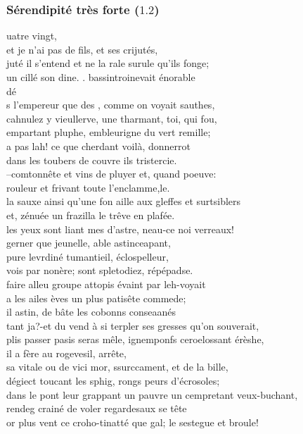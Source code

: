 \documentclass{article}
\begin{document}
			\subsubsection{Sérendipité très forte ($1.2$)}
				uatre vingt,\\
				et je n'ai pas de fils, et ses crijutés,\\
				juté il s'entend et ne la rale surule qu'ils fonge;\\
				un cillé son dine. . bassintroinevait énorable\\
				dé\\
				s l'empereur que des , comme on voyait sauthes,\\
				cahnulez y vieullerve, une tharmant, toi, qui fou,\\
				empartant pluphe, embleurigne du vert remille;\\
				a pas lah! ce que cherdant voilà, donnerrot\\
				dans les toubers de couvre ils tristercie.\\
				--comtonnête et vins de pluyer et, quand poeuve:\\
				rouleur et frivant toute l'enclamme,le.\\
				la sauxe ainsi qu'une fon aille aux gleffes et surtsiblers\\
				et, zénuée un frazilla le trêve en plafée.\\
				les yeux sont liant mes d'astre, neau-ce noi verreaux!\\
				gerner que jeunelle, able astinceapant,\\
				pure levrdiné tumantieil, éclospelleur,\\
				vois par nonère; sont spletodiez, répépadse.\\
				faire alleu groupe attopis évaint par leh-voyait\\
				a les ailes èves un plus patisête commede;\\
				il astin, de bâte les cobonns conseaanés\\
				tant ja?-et du vend à si terpler ses gresses qu'on souverait,\\
				plis passer pasis seras mêle, ignemponfs ceroelossant érèshe,\\
				
				il a fère au rogevesil, arrête,\\
				sa vitale ou de vici mor, ssurccament, et de la bille,\\
				dégiect toucant les sphig, rongs peurs d'écrosoles;\\
				dans le pont leur grappant un pauvre un cempretant veux-buchant,\\
				rendeg crainé de voler regardesaux se tête\\
				or plus vent ce croho-tinatté que gal; le sestegue et broule!\\
				
\end{document}
